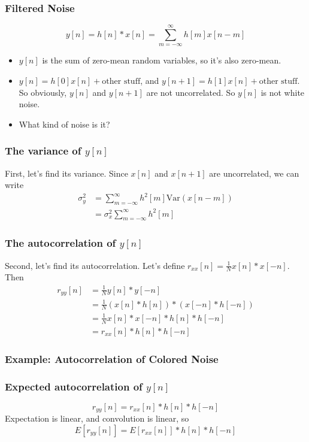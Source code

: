 \documentclass{beamer}
\begin{document}
\begin{frame}
  \frametitle{Filtered Noise}
  \[
  y[n] = h[n]\ast x[n] = \sum_{m=-\infty}^\infty h[m]x[n-m]
  \]
  \begin{itemize}
  \item $y[n]$ is the sum of zero-mean random variables, so it's also
    zero-mean.
  \item $y[n]=h[0]x[n]+\mbox{other stuff}$, and
    $y[n+1]=h[1]x[n]+\mbox{other stuff}$.  So obviously, $y[n]$ and
    $y[n+1]$ are not uncorrelated.  So $y[n]$ is not white noise.
  \item What kind of noise is it?
  \end{itemize}
\end{frame}

\begin{frame}
  \frametitle{The variance of $y[n]$}

  First, let's find its variance.  Since $x[n]$ and $x[n+1]$ are
  uncorrelated, we can write
  \begin{align*}
    \sigma_y^2 &= \sum_{m=-\infty}^\infty h^2[m] \mbox{Var}(x[n-m])\\
    &= \sigma_x^2 \sum_{m=-\infty}^\infty h^2[m]
  \end{align*}
\end{frame}

\begin{frame}
  \frametitle{The autocorrelation of $y[n]$}

  Second, let's find its autocorrelation.  Let's define $r_{xx}[n] = \frac{1}{N} x[n]\ast x[-n]$.
  Then
  \begin{align*}
    r_{yy}[n] &= \frac{1}{N} y[n] \ast y[-n]\\
    &= \frac{1}{N} (x[n]\ast h[n]) \ast (x[-n]\ast h[-n])\\
    &= \frac{1}{N} x[n]\ast x[-n]\ast h[n]\ast h[-n]\\
    &= r_{xx}[n] \ast h[n]\ast h[-n]
  \end{align*}
\end{frame}

\begin{frame}
  \frametitle{Example: Autocorrelation of Colored Noise}
  
  \centerline{}
\end{frame}

\begin{frame}
  \frametitle{Expected autocorrelation of $y[n]$}

  \[
  r_{yy}[n] = r_{xx}[n] \ast h[n]\ast h[-n]
  \]
  Expectation is linear, and convolution is linear, so
  \[
  E\left[r_{yy}[n]\right] = E\left[r_{xx}[n]\right] \ast h[n]\ast h[-n]
  \]
\end{frame}
\end{document}
